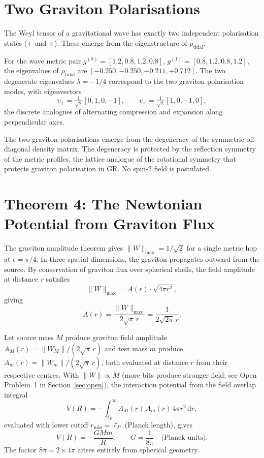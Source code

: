 \documentclass[11pt]{article}
\begin{document}
\section{Two Graviton Polarisations}
\label{sec:polarisation}

The Weyl tensor of a gravitational wave has exactly two independent
polarisation states ($+$ and $\times$).
These emerge from the eigenstructure of $\rho_{\mathrm{tidal}}$.

For the wave metric pair $g^{(0)} = [1.2, 0.8, 1.2, 0.8]$,
$g^{(1)} = [0.8, 1.2, 0.8, 1.2]$, the eigenvalues of
$\rho_{\mathrm{tidal}}$ are $[-0.250, -0.250, -0.211, +0.712]$.
The two degenerate eigenvalues $\lambda = -1/4$ correspond to the two
graviton polarisation modes, with eigenvectors
\[
  v_+ = \tfrac{1}{\sqrt{2}}[0, 1, 0, -1], \qquad
  v_\times = \tfrac{1}{\sqrt{2}}[1, 0, -1, 0],
\]
the discrete analogues of alternating compression and expansion along
perpendicular axes.

\begin{corollary}
The two graviton polarisations emerge from the degeneracy of the
symmetric off-diagonal density matrix.
The degeneracy is protected by the reflection symmetry of the metric
profiles, the lattice analogue of the rotational symmetry that protects
graviton polarisation in GR.
No spin-2 field is postulated.
\end{corollary}

\section{Theorem 4: The Newtonian Potential from Graviton Flux}
\label{sec:potential}

The graviton amplitude theorem gives $\|W\|_{\max} = 1/\sqrt{2}$ for
a single metric hop at $\epsilon = \pi/4$.
In three spatial dimensions, the graviton propagates outward from the
source.
By conservation of graviton flux over spherical shells, the field
amplitude at distance $r$ satisfies
\[
  \|W\|_{\max} = A(r) \cdot \sqrt{4\pi r^2},
\]
giving
\[
  A(r) = \frac{\|W\|_{\max}}{2\sqrt{\pi}\,r}
       = \frac{1}{2\sqrt{2\pi}\,r}.
\]

\begin{theorem}
\label{thm:potential}
Let source mass $M$ produce graviton field amplitude
$A_M(r) = \|W_M\|/(2\sqrt{\pi}\,r)$ and test mass $m$ produce
$A_m(r) = \|W_m\|/(2\sqrt{\pi}\,r)$, both evaluated at distance $r$
from their respective centres.
With $\|W\| \propto M$ (more bits produce stronger field; see
Open Problem~1 in Section~\ref{sec:open}), the interaction potential
from the field overlap integral
\[
  V(R) = -\int_{\ell_P}^{\infty} A_M(r)\,A_m(r)\,4\pi r^2\,\mathrm{d}r,
\]
evaluated with lower cutoff $r_{\min} = \ell_P$ (Planck length), gives
\[
  \boxed{V(R) = -\frac{GMm}{R},
  \qquad G = \frac{1}{8\pi} \quad \text{(Planck units)}.}
\]
The factor $8\pi = 2 \times 4\pi$ arises entirely from spherical
geometry.
\end{theorem}
\end{document}
